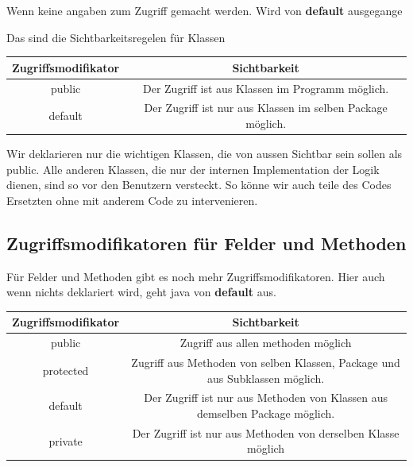 \documentclass[12pt]{article}
\begin{document}
    Wenn keine angaben zum Zugriff gemacht werden. Wird von \textbf{default} ausgegange

    Das sind die Sichtbarkeitsregelen für Klassen
    \begin{table}[h]
        \centering
        \begin{tabular}{| c | c | }
            \hline
            Zugriffsmodifikator & Sichtbarkeit \\
            \hline
            public & Der Zugriff ist aus Klassen im Programm möglich. \\
            \hline
            default & Der Zugriff ist nur aus Klassen im selben Package möglich. \\
            \hline
        \end{tabular}
    \end{table}

    Wir deklarieren nur die wichtigen Klassen, die von aussen Sichtbar sein sollen als public. 
    Alle anderen Klassen, die nur der internen Implementation der Logik dienen, sind so vor den Benutzern versteckt. So 
    könne wir auch teile des Codes Ersetzten ohne mit anderem Code zu intervenieren. 

    \newpage
    \subsection*{Zugriffsmodifikatoren für Felder und Methoden}

    Für Felder und Methoden gibt es noch mehr Zugriffsmodifikatoren. Hier auch wenn nichts deklariert wird, 
    geht java von \textbf{default} aus. 


    \begin{table}[h]
        \centering
        \begin{tabular}{ | c | c |  }
            \hline
            Zugriffsmodifikator & Sichtbarkeit \\
            \hline
            public & Zugriff aus allen methoden möglich\\
            \hline 
            protected & Zugriff aus Methoden von selben Klassen, Package und aus Subklassen möglich. \\
            \hline 
            default & Der Zugriff ist nur aus Methoden von Klassen aus demselben Package möglich. \\
            \hline 
            private & Der Zugriff ist nur aus Methoden von derselben Klasse möglich \\
            \hline 

        \end{tabular}
    \end{table}
\end{document}
